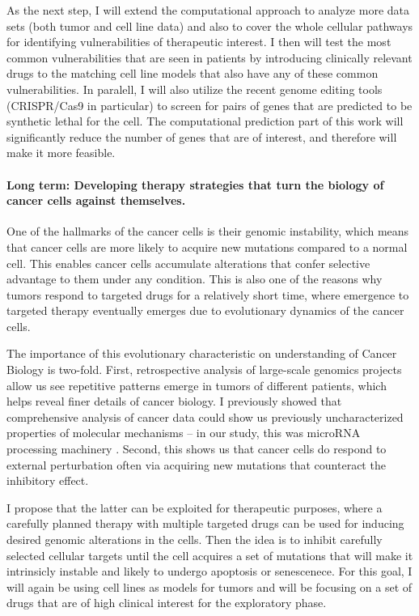 \documentclass[11pt,letterpaper]{article}
\begin{document}
As the next step, I will extend the computational approach to analyze more data sets (both tumor and cell line data) and also to cover the whole cellular pathways for identifying vulnerabilities of therapeutic interest.
I then will test the most common vulnerabilities that are seen in patients by introducing clinically relevant drugs to the matching cell line models that also have any of these common vulnerabilities.
In paralell, I will also utilize the recent genome editing tools (CRISPR/Cas9 in particular)
to screen for pairs of genes that are predicted to be synthetic lethal for the cell.
The computational prediction part of this work will significantly reduce the number of genes that are of interest,
and therefore will make it more feasible.

\paragraph{Long term: Developing therapy strategies that turn the biology of cancer cells against themselves.}
One of the hallmarks of the cancer cells is their genomic instability, 
which means that cancer cells are more likely to acquire new mutations compared to a normal cell.
This enables cancer cells accumulate alterations that confer selective advantage to them under any condition.
This is also one of the reasons why tumors respond to targeted drugs for a relatively short time,
where emergence to targeted therapy eventually emerges due to evolutionary dynamics of the cancer cells.

The importance of this evolutionary characteristic on understanding of Cancer Biology is two-fold.
First, retrospective analysis of large-scale genomics projects allow us see repetitive patterns emerge in tumors of different patients, which helps reveal finer details of cancer biology.
I previously showed that comprehensive analysis of cancer data could show us previously uncharacterized properties of molecular mechanisms -- in our study, this was microRNA processing machinery \cite{aksoy2014cancer}.
Second, this shows us that cancer cells do respond to external perturbation often via acquiring new mutations that counteract the inhibitory effect.

I propose that the latter can be exploited for therapeutic purposes,
where a carefully planned therapy with multiple targeted drugs can be used for inducing desired genomic alterations in the cells.
Then the idea is to inhibit carefully selected cellular targets until the cell acquires a set of mutations that will make it intrinsicly instable and likely to undergo apoptosis or senescenece.
For this goal, I will again be using cell lines as models for tumors
and will be focusing on a set of drugs that are of high clinical interest for the exploratory phase.

\clearpage

\footnotesize{
{}
}
\end{document}
